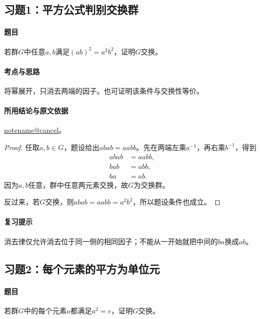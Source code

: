 \documentclass[UTF8,a4paper,11pt,fontset=windows]{ctexart}
\makeatletter
\newcommand{\noteref}[1]{\hyperref[note:#1]{\csname notename@#1\endcsname}}
\newcommand{\exref}[2]{\hyperref[ex:#1:#2]{第#1章习题#2}}
\makeatother
\begin{document}
\subsection{习题1：\texorpdfstring{平方公式判别交换群}{平方公式判别交换群}}
\label{ex:1:1}

\paragraph{题目}
若群$G$中任意$a,b$满足$(ab)^2=a^2b^2$，证明$G$交换。

\paragraph{考点与思路}
将幂展开，只消去两端的因子。也可证明该条件与交换性等价。

\paragraph{所用结论与原文依据}
\noteref{cancel}。


\begin{proof}
任取$a,b\in G$，题设给出$abab=aabb$。先在两端左乘$a^{-1}$，再右乘$b^{-1}$，得到
\begin{align*}
abab&=aabb,\\
bab&=abb,\\
ba&=ab.
\end{align*}
因为$a,b$任意，群中任意两元素交换，故$G$为交换群。

反过来，若$G$交换，则$abab=aabb=a^2b^2$，所以题设条件也成立。
\end{proof}

\paragraph{复习提示}
消去律仅允许消去位于同一侧的相同因子；不能从一开始就把中间的$ba$换成$ab$。


\subsection{习题2：\texorpdfstring{每个元素的平方为单位元}{每个元素的平方为单位元}}
\label{ex:1:2}

\paragraph{题目}
若群$G$中的每个元素$a$都满足$a^2=e$，证明$G$交换。
\end{document}
